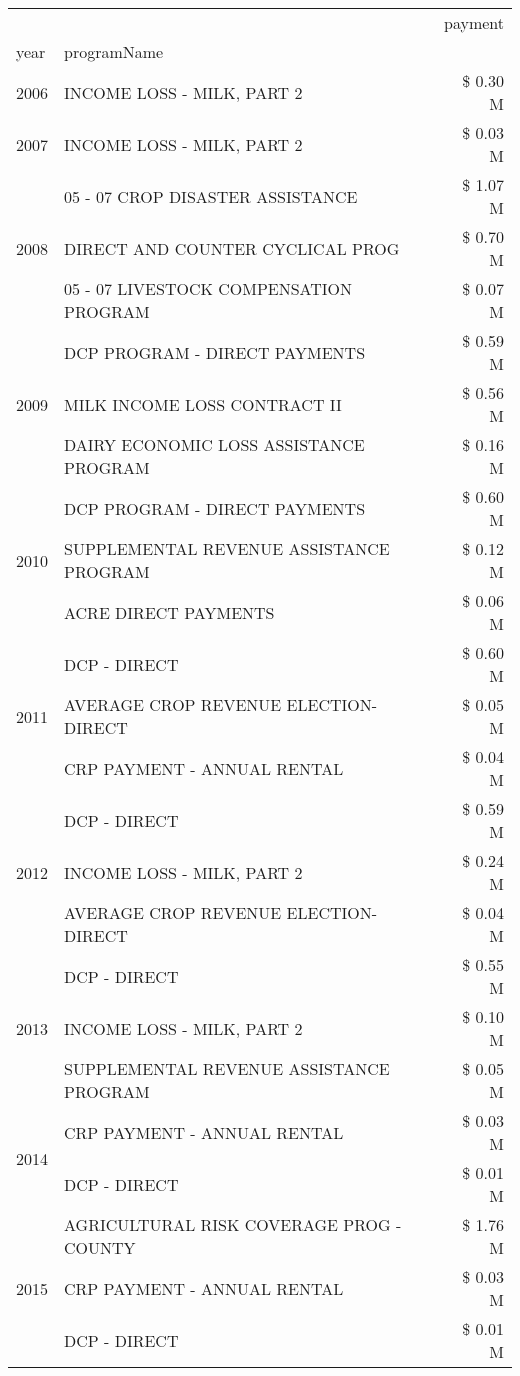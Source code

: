 \begin{tabular}{llr}
\toprule
 &  & payment \\
year & programName &  \\
\midrule
2006 & INCOME LOSS - MILK, PART 2 & \$ 0.30 M \\
\cline{1-3}
2007 & INCOME LOSS - MILK, PART 2 & \$ 0.03 M \\
\cline{1-3}
\multirow[t]{3}{*}{2008} & 05 - 07 CROP DISASTER ASSISTANCE & \$ 1.07 M \\
 & DIRECT AND COUNTER CYCLICAL PROG & \$ 0.70 M \\
 & 05 - 07 LIVESTOCK COMPENSATION PROGRAM & \$ 0.07 M \\
\cline{1-3}
\multirow[t]{3}{*}{2009} & DCP PROGRAM - DIRECT PAYMENTS & \$ 0.59 M \\
 & MILK INCOME LOSS CONTRACT II & \$ 0.56 M \\
 & DAIRY ECONOMIC LOSS ASSISTANCE PROGRAM & \$ 0.16 M \\
\cline{1-3}
\multirow[t]{3}{*}{2010} & DCP PROGRAM - DIRECT PAYMENTS & \$ 0.60 M \\
 & SUPPLEMENTAL REVENUE ASSISTANCE PROGRAM & \$ 0.12 M \\
 & ACRE DIRECT PAYMENTS & \$ 0.06 M \\
\cline{1-3}
\multirow[t]{3}{*}{2011} & DCP - DIRECT & \$ 0.60 M \\
 & AVERAGE CROP REVENUE ELECTION-DIRECT & \$ 0.05 M \\
 & CRP PAYMENT - ANNUAL RENTAL & \$ 0.04 M \\
\cline{1-3}
\multirow[t]{3}{*}{2012} & DCP - DIRECT & \$ 0.59 M \\
 & INCOME LOSS - MILK, PART 2 & \$ 0.24 M \\
 & AVERAGE CROP REVENUE ELECTION-DIRECT & \$ 0.04 M \\
\cline{1-3}
\multirow[t]{3}{*}{2013} & DCP - DIRECT & \$ 0.55 M \\
 & INCOME LOSS - MILK, PART 2 & \$ 0.10 M \\
 & SUPPLEMENTAL REVENUE ASSISTANCE PROGRAM & \$ 0.05 M \\
\cline{1-3}
\multirow[t]{2}{*}{2014} & CRP PAYMENT - ANNUAL RENTAL & \$ 0.03 M \\
 & DCP - DIRECT & \$ 0.01 M \\
\cline{1-3}
\multirow[t]{3}{*}{2015} & AGRICULTURAL RISK COVERAGE PROG - COUNTY & \$ 1.76 M \\
 & CRP PAYMENT - ANNUAL RENTAL & \$ 0.03 M \\
 & DCP - DIRECT & \$ 0.01 M \\

\end{tabular}
